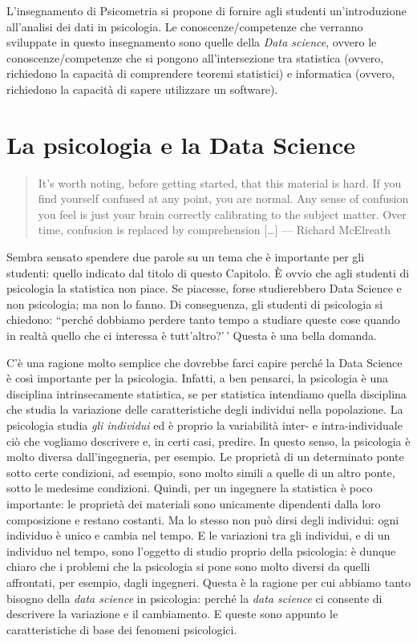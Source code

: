 \documentclass[
  10pt,
  italian,
  a4paper,
  extrafontsizes,onecolumn,openright
  ]{memoir}
\begin{document}
L'insegnamento di Psicometria si propone di fornire agli studenti un'introduzione all'analisi dei dati in psicologia.
Le conoscenze/competenze che verranno sviluppate in questo insegnamento sono quelle della \emph{Data science}, ovvero le conoscenze/competenze che si pongono all'intersezione tra statistica (ovvero, richiedono la capacità di comprendere teoremi statistici) e informatica (ovvero, richiedono la capacità di sapere utilizzare un software).

\hypertarget{la-psicologia-e-la-data-science}{%
\section*{La psicologia e la Data Science}\label{la-psicologia-e-la-data-science}}

\begin{quote}
It's worth noting, before getting started, that this material is hard. If you find yourself confused at any point, you are normal. Any sense of confusion you feel is just your brain correctly calibrating to the subject matter. Over time, confusion is replaced by comprehension {[}\ldots{]} --- Richard McElreath
\end{quote}

Sembra sensato spendere due parole su un tema che è importante per gli studenti: quello indicato dal titolo di questo Capitolo. È ovvio che agli studenti di psicologia la statistica non piace. Se piacesse, forse studierebbero Data Science e non psicologia; ma non lo fanno. Di conseguenza, gli studenti di psicologia si chiedono: ``perché dobbiamo perdere tanto tempo a studiare queste cose quando in realtà quello che ci interessa è tutt'altro?'\,' Questa è una bella domanda.

C'è una ragione molto semplice che dovrebbe farci capire perché la Data Science è così importante per la psicologia. Infatti, a ben pensarci, la psicologia è una disciplina intrinsecamente statistica, se per statistica intendiamo quella disciplina che studia la variazione delle caratteristiche degli individui nella popolazione. La psicologia studia \emph{gli individui} ed è proprio la variabilità inter- e intra-individuale ciò che vogliamo descrivere e, in certi casi, predire. In questo senso, la psicologia è molto diversa dall'ingegneria, per esempio. Le proprietà di un determinato ponte sotto certe condizioni, ad esempio, sono molto simili a quelle di un altro ponte, sotto le medesime condizioni. Quindi, per un ingegnere la statistica è poco importante: le proprietà dei materiali sono unicamente dipendenti dalla loro composizione e restano costanti. Ma lo stesso non può dirsi degli individui: ogni individuo è unico e cambia nel tempo. E le variazioni tra gli individui, e di un individuo nel tempo, sono l'oggetto di studio proprio della psicologia: è dunque chiaro che i problemi che la psicologia si pone sono molto diversi da quelli affrontati, per esempio, dagli ingegneri. Questa è la ragione per cui abbiamo tanto bisogno della \emph{data science} in psicologia: perché la \emph{data science} ci consente di descrivere la variazione e il cambiamento. E queste sono appunto le caratteristiche di base dei fenomeni psicologici.
\end{document}
